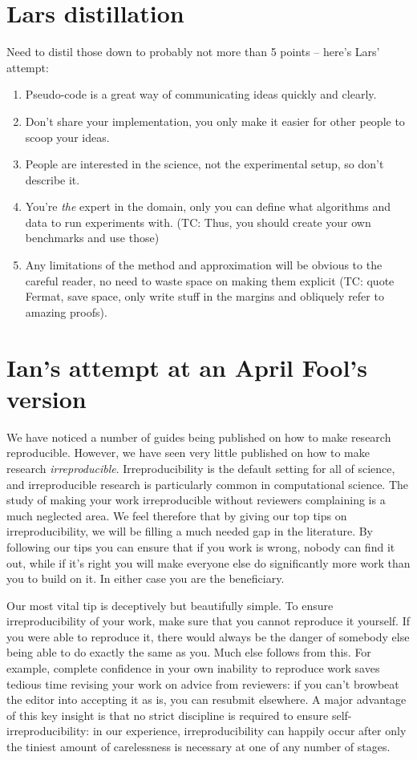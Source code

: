 \documentclass[a4paper,11pt]{article}
\begin{document}
\section{Lars distillation}
Need to distil those down to probably not more than 5 points -- here's Lars'
attempt:
\begin{enumerate}
\item Pseudo-code is a great way of communicating ideas quickly and clearly.
\item Don't share your implementation, you only make it easier for other people
to scoop your ideas.
\item People are interested in the science, not the experimental setup, so don't
describe it.
\item You're \emph{the} expert in the domain, only you can define what
algorithms and data to run experiments with. (TC: Thus, you should
create your own benchmarks and use those)
\item Any limitations of the method and approximation will be obvious to the
careful reader, no need to waste space on making them explicit (TC:
quote Fermat, save space, only write stuff in the margins and obliquely
refer to amazing proofs).
\end{enumerate}

\section{Ian's attempt at an April Fool's version}

We have noticed a number of guides being published on how to make research reproducible. However, we have seen very little published on how to make research \emph{irreproducible}.  Irreproducibility is the default setting for all of science, and irreproducible research is particularly common in computational science.  The study of making your work irreproducible without reviewers complaining is a much neglected area. We feel therefore that by giving our top tips on irreproducibility, we will be filling a much needed gap in the literature.
By following our tips you can ensure that if you work is wrong, nobody can find it out, while if it's right you will make everyone else do significantly more work than you to build on it. In either case you are the beneficiary.

Our most vital tip is deceptively but beautifully simple. To ensure irreproducibility of your work, make sure that you cannot reproduce it yourself. If you were able to reproduce it, there would always be the danger of somebody else being able to do exactly the same as you. Much else follows from this. For example, complete confidence in your own inability to reproduce work saves tedious time revising your work on advice from reviewers: if you can't browbeat the editor into accepting it as is, you can resubmit elsewhere. A major advantage of this key insight is that no strict discipline is required to ensure self-irreproducibility: in our experience, irreproducibility can happily occur after only the tiniest amount of carelessness is necessary at one of any number of stages.
\end{document}
